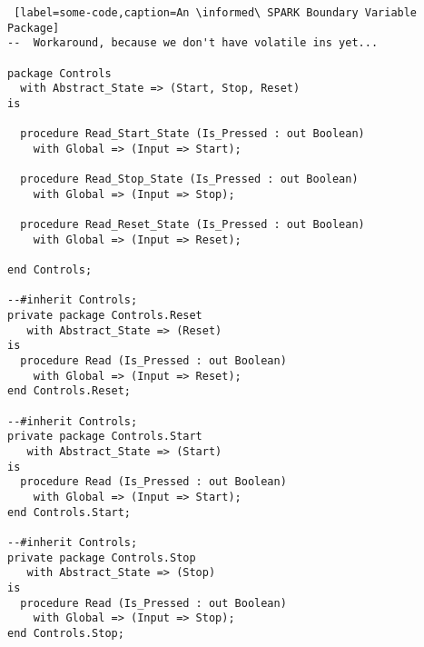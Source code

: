 \begin{lstlisting} [label=some-code,caption=An \informed\ SPARK Boundary Variable Package]
--  Workaround, because we don't have volatile ins yet...

package Controls
  with Abstract_State => (Start, Stop, Reset)
is

  procedure Read_Start_State (Is_Pressed : out Boolean)
    with Global => (Input => Start);

  procedure Read_Stop_State (Is_Pressed : out Boolean)
    with Global => (Input => Stop);

  procedure Read_Reset_State (Is_Pressed : out Boolean)
    with Global => (Input => Reset);

end Controls;

--#inherit Controls;
private package Controls.Reset
   with Abstract_State => (Reset)
is
  procedure Read (Is_Pressed : out Boolean)
    with Global => (Input => Reset);
end Controls.Reset;

--#inherit Controls;
private package Controls.Start
   with Abstract_State => (Start)
is
  procedure Read (Is_Pressed : out Boolean)
    with Global => (Input => Start);
end Controls.Start;

--#inherit Controls;
private package Controls.Stop
   with Abstract_State => (Stop)
is
  procedure Read (Is_Pressed : out Boolean)
    with Global => (Input => Stop);
end Controls.Stop;

\end{lstlisting}

